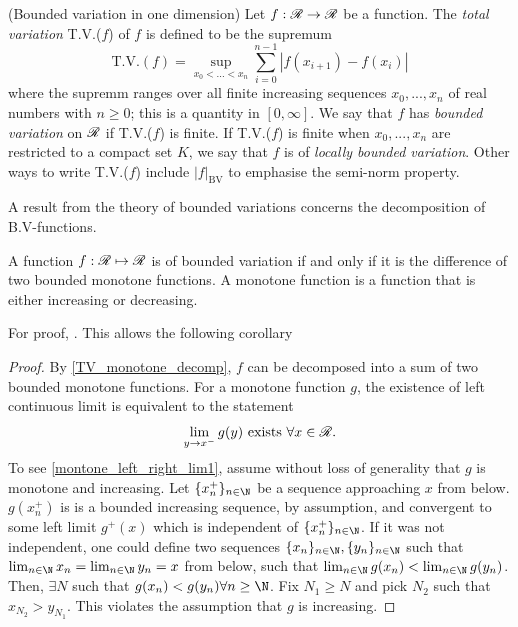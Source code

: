 \begin{definition}(Bounded variation in one dimension)
Let $f : \mathscr{R} \rightarrow \mathscr{R}$ be a function. The \emph{total variation} T.V.($f$) of $f$ is defined to be the supremum
\begin{equation} \label{TV_1d}
	\text{T.V.}(f) = \sup_{x_0 < ... < x_n} \sum_{i = 0}^{n-1} \left| f(x_{i+1}) - f(x_i)\right|
\end{equation} 
where the supremm ranges over all finite increasing sequences $x_0, ..., x_n$ of real numbers with $n \geq 0$; this is a quantity in $[0, \infty]$. We say that $f$ has \emph{bounded variation} on $\mathscr{R}$ if T.V.($f$) is finite. If T.V.($f$) is finite when $x_0, ..., x_n$ are restricted to a compact set $K$, we say that $f$ is of \emph{locally bounded variation}. Other ways to write T.V.($f$) include $\left|f\right|_{\text{BV}}$ to emphasise the semi-norm property. %
%

A result from the theory of bounded variations concerns the decomposition of B.V-functions. 

\begin{proposition} \label{TV_monotone_decomp}
	A function $f : \R \mapsto \R$ is of bounded variation if and only if it is the difference of two bounded monotone functions. A monotone function is a function that is either increasing or decreasing.
\end{proposition}
For proof, \cite[see][p.166]{tao2011introduction}.
This allows the following corollary
\begin{corollary}
	Any function $f : \R \mapsto \R$ of bounded variation has a left- continuous version $\tilde{f}}$ such that 
	\begin{equation}
		\text{T.V.}(f) = \text{T.V.}(\tilde{f})
	\end{equation}
\end{corollary}
\begin{proof}
	By \eqref{TV_monotone_decomp}, $f$ can be decomposed into a sum of two bounded monotone functions. For a monotone function $g$, the existence of left continuous limit is equivalent to the statement
	\begin{align}
		\lim_{y \rightarrow x^-} g(y) \text{ exists } \forall x \in \R.  \label{montone_left_right_lim1} 
	\end{align}
	 To see \eqref{montone_left_right_lim1}, assume without loss of generality that $g$ is monotone and increasing. Let $\{x_n^+\}_{n \in \N}$ be a sequence approaching $x$ from below. $g(x_n^+)$ is is a bounded increasing sequence, by assumption, and  convergent to some left limit $g^+(x)$ which is independent of  $\{x_n^+\}_{n \in \N}$. If it was not independent, one could define two sequences $\{x_n\}_{n \in \N}, \{y_n\}_{n \in \N}$ such that $\lim_{n \in \N} x_n = \lim_{n \in \N} y_n = x$ from below,  such that $\lim_{n \in \N} g(x_n) < \lim_{n \in \N} g(y_n)$. Then, $\exists N$ such that $ g(x_n) < g(y_n) \forall n \geq \N$. Fix $N_1 \geq N$ and pick $N_2$ such that $x_{N_2} > y_{N_1}$. This violates the assumption that $g$ is increasing.
	 

\end{proof}
\end{definition}
